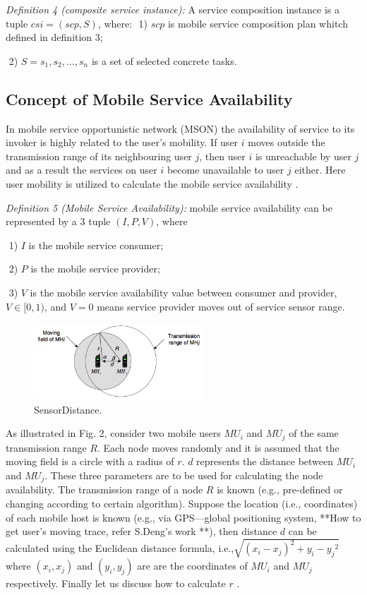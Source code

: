 \documentclass[10pt,journal,compsoc]{IEEEtran}
\begin{document}
\textit{Definition 4 (composite service instance):} A service composition instance is a tuple $csi = (scp, S)$, where:
​	1) $scp$ is mobile service composition plan whitch defined in definition 3;

​	2) $S = {s_1, s_2,…,s_n}$ is a set of selected concrete tasks.

\subsection{Concept of Mobile Service Availability}
In mobile service opportunistic network (MSON) the availability of service to its invoker is highly related to the user’s mobility. If user $i$ moves outside the transmission range of its neighbouring user $j$, then user $i$ is unreachable by user $j$ and as a result the services on user $i$ become unavailable to user $j$ either. Here user mobility is utilized to calculate the mobile service availability \cite{Yang2010}.

\textit{Definition 5 (Mobile Service Availability):} mobile service availability can be represented by a 3 tuple $(I, P, V) $, where

​	1) $I$ is the mobile service consumer;

​	2) $P$ is the mobile service provider;

​	3) $V$ is the mobile service availability value between consumer and provider, $V \in [0,1)$, and $V=0$ means service provider moves out of service sensor range.


\begin{figure}[!t]
\centering
\includegraphics[width=2.5in]{./img/fig3.png}
\caption{SensorDistance.}
\label{fig_sim}
\end{figure}

As illustrated in Fig. 2, consider two mobile users $MU_i$ and $MU_j$ of the same transmission range $R$. Each node moves randomly and it is assumed that the moving field is a circle with a radius of $r$. $d$ represents the distance between $MU_i$ and $MU_j$. These three parameters are to be used for calculating the node availability. The transmission range of a node $R$ is known (e.g., pre-defined or changing according to certain algorithm). Suppose the location (i.e., coordinates) of each mobile host is known (e.g., via GPS—global positioning system, **How to get user's moving trace, refer S.Deng's work **), then distance $d$ can be calculated using the Euclidean distance formula, i.e.,$\sqrt{{(x_i-x_j)^2}+{y_i-y_j}^2}$ where $(x_i, x_j)$ and $(y_i, y_j)$ are are the coordinates of $MU_i$ and $MU_j$ respectively. Finally let us discuss how to calculate $r$ \cite{Yang2010}.
\end{document}
